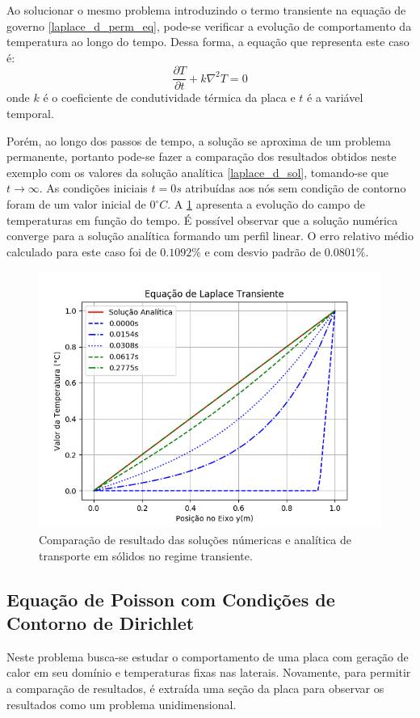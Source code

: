 Ao solucionar o mesmo problema introduzindo o termo transiente na equação de governo \ref{laplace_d_perm_eq}, pode-se verificar a evolução de comportamento da temperatura ao longo do tempo.
Dessa forma, a equação que representa este caso é:
\begin{equation}
    \dfrac{\partial T}{\partial t} + k\nabla^2 T = 0
    \label{laplace_d_trans_eq} 
\end{equation}
onde $k$ é o coeficiente de condutividade térmica da placa e $t$ é a variável temporal.

Porém, ao longo dos passos de tempo, a solução se aproxima de um problema permanente, portanto pode-se fazer a comparação dos resultados obtidos neste exemplo com os valores da solução analítica \eqref{laplace_d_sol}, tomando-se que $t\rightarrow \infty$.
As condições iniciais $t=0s$ atribuídas aos nós sem condição de contorno foram de um valor inicial de $0^{\circ}C$.
A \ref{laplace_d_trans_comp} apresenta a evolução do campo de temperaturas em função do tempo.
É possível observar que a solução numérica converge para a solução analítica formando um perfil linear.
O erro relativo médio calculado para este caso foi de $0.1092\%$ e com desvio padrão de $0.0801\%$.
\begin{figure}[H]
    \centering
    \includegraphics[width=.7\linewidth]{figures/laplace_dirichlet_transient_comparison.png}
    \caption{Comparação de resultado das soluções númericas e analítica de transporte em sólidos no regime transiente.}
    \label{laplace_d_trans_comp}
\end{figure}


\subsection{\textbf{Equação de Poisson com Condições de Contorno de Dirichlet}}
\label{sec_poisson_dir}
Neste problema busca-se estudar o comportamento de uma placa com geração de calor em seu domínio e temperaturas fixas nas laterais.
Novamente, para permitir a comparação de resultados, é extraída uma seção da placa para observar os resultados como um problema unidimensional.

